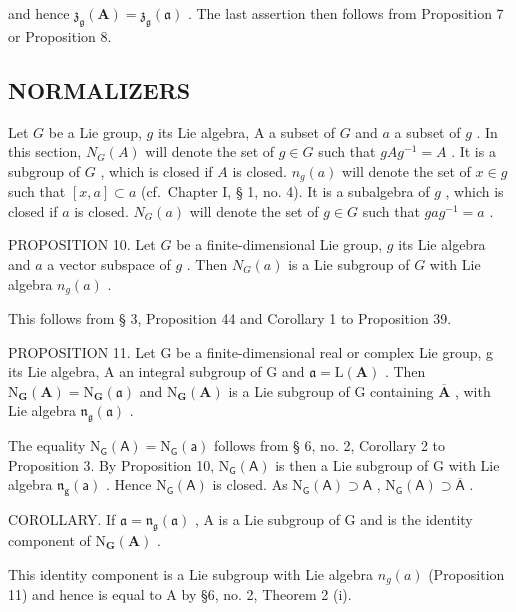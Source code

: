 and hence \(\mathfrak{z}_{\mathfrak{g}}(\mathbf{A}) = \mathfrak{z}_{\mathfrak{g}}(\mathfrak{a})\) . The last assertion then follows from Proposition 7 or Proposition 8.

\subsection{NORMALIZERS}

Let \(G\) be a Lie group, \(g\) its Lie algebra, A a subset of \(G\) and \(a\) a subset of \(g\) . In this section, \(N_G(A)\) will denote the set of \(g \in G\) such that \(gAg^{-1} = A\) . It is a subgroup of \(G\) , which is closed if \(A\) is closed. \(n_g(a)\) will denote the set of \(x \in g\) such that \([x, a] \subset a\) (cf.~Chapter I, § 1, no. 4). It is a subalgebra of \(g\) , which is closed if \(a\) is closed. \(N_G(a)\) will denote the set of \(g \in G\) such that \(gag^{-1} = a\) .

PROPOSITION 10. Let \(G\) be a finite-dimensional Lie group, \(g\) its Lie algebra and \(a\) a vector subspace of \(g\) . Then \(N_G(a)\) is a Lie subgroup of \(G\) with Lie algebra \(n_g(a)\) .

This follows from § 3, Proposition 44 and Corollary 1 to Proposition 39.

PROPOSITION 11. Let G be a finite-dimensional real or complex Lie group, g its Lie algebra, A an integral subgroup of G and \(\mathfrak{a} = \mathrm{L}(\mathbf{A})\) . Then \(\mathrm{N}_{\mathbf{G}}(\mathbf{A}) = \mathrm{N}_{\mathbf{G}}(\mathfrak{a})\) and \(\mathrm{N}_{\mathbf{G}}(\mathbf{A})\) is a Lie subgroup of G containing \(\overline{\mathbf{A}}\) , with Lie algebra \(\mathfrak{n}_{\mathfrak{g}}(\mathfrak{a})\) .

The equality \(\mathrm{N}_{\mathsf{G}}(\mathsf{A}) = \mathrm{N}_{\mathsf{G}}(\mathsf{a})\) follows from § 6, no. 2, Corollary 2 to Proposition 3. By Proposition 10, \(\mathrm{N}_{\mathsf{G}}(\mathsf{A})\) is then a Lie subgroup of G with Lie algebra \(\mathfrak{n}_{\mathsf{g}}(\mathsf{a})\) . Hence \(\mathrm{N}_{\mathsf{G}}(\mathsf{A})\) is closed. As \(\mathrm{N}_{\mathsf{G}}(\mathsf{A}) \supset \mathsf{A}\) , \(\mathrm{N}_{\mathsf{G}}(\mathsf{A}) \supset \overline{\mathsf{A}}\) .

COROLLARY. If \(\mathfrak{a} = \mathfrak{n}_{\mathfrak{g}}(\mathfrak{a})\) , A is a Lie subgroup of G and is the identity component of \(\mathrm{N}_{\mathbf{G}}(\mathbf{A})\) .

This identity component is a Lie subgroup with Lie algebra \(n_{g}(a)\) (Proposition 11) and hence is equal to A by §6, no. 2, Theorem 2 (i).
